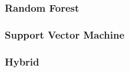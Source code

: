 \subsubsection{Random Forest} %
\label{ssub:random_forest}

\subsubsection{Support Vector Machine} %
\label{ssub:support_vector_machine}

\subsubsection{Hybrid} %
\label{ssub:hybrid}

